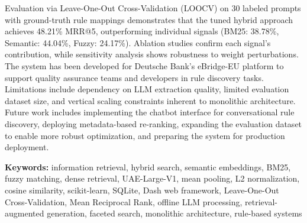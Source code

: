Evaluation via Leave-One-Out Cross-Validation (LOOCV) on 30 labeled prompts with ground-truth rule mappings demonstrates that the tuned hybrid approach achieves 48.21\% MRR@5, outperforming individual signals (BM25: 38.78\%, Semantic: 44.04\%, Fuzzy: 24.17\%). Ablation studies confirm each signal's contribution, while sensitivity analysis shows robustness to weight perturbations. The system has been developed for Deutsche Bank's eBridge-EU platform to support quality assurance teams and developers in rule discovery tasks. Limitations include dependency on LLM extraction quality, limited evaluation dataset size, and vertical scaling constraints inherent to monolithic architecture. Future work includes implementing the chatbot interface for conversational rule discovery, deploying metadata-based re-ranking, expanding the evaluation dataset to enable more robust optimization, and preparing the system for production deployment.

\medskip
\noindent\textbf{Keywords:} information retrieval, hybrid search, semantic embeddings, BM25, fuzzy matching, dense retrieval, UAE-Large-V1, mean pooling, L2 normalization, cosine similarity, scikit-learn, SQLite, Dash web framework, Leave-One-Out Cross-Validation, Mean Reciprocal Rank, offline LLM processing, retrieval-augmented generation, faceted search, monolithic architecture, rule-based systems
